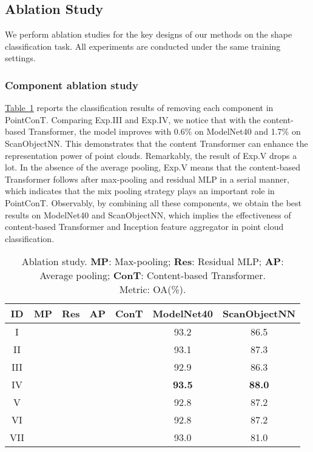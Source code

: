 \documentclass[lettersize,journal]{IEEEtran}
\begin{document}
\subsection{Ablation Study}
We perform ablation studies for the key designs of our methods on the shape classification task. 
All experiments are conducted under the same training settings.

\subsubsection*{\bf Component ablation study}
\hyperref[Table:Ablation study]{Table~\ref*{Table:Ablation study}} reports the classification results of removing each component in PointConT. 
Comparing Exp.III and Exp.IV, we notice that with the content-based Transformer, the model improves with 0.6\% on ModelNet40 and 1.7\% on ScanObjectNN. 
This demonstrates that the content Transformer can enhance the representation power of point clouds.
Remarkably, the result of Exp.V drops a lot. In the absence of the average pooling, 
Exp.V means that the content-based Transformer follows after max-pooling and residual MLP in a serial manner, 
which indicates that the mix pooling strategy plays an important role in PointConT.
Observably, by combining all these components, we obtain the best results on ModelNet40 and ScanObjectNN, 
which implies the effectiveness of content-based Transformer and Inception feature aggregator in point cloud classification.


\begin{table}[h]
  \caption{Ablation study. \textbf{MP}: Max-pooling; \textbf{Res}: Residual MLP; \textbf{AP}: Average pooling; \textbf{ConT}: Content-based Transformer. 
  \protect\\ Metric: OA(\%).}
  \label{Table:Ablation study}
  \centering
\begin{tabular}{c|cccc|cc}
    \toprule
  ID & MP     & Res      & AP      & ConT         & ModelNet40    & ScanObjectNN  \\ \midrule
  I &  &              &              &              & 93.2          & 86.5          \\
  II &  &  &              &              & 93.1          & 87.3          \\
  III &  &  &  &              & 92.9          & 86.3          \\ 
  IV &  &  &  &  & \textbf{93.5} & \textbf{88.0} \\ \midrule
  V &  &  &              &  & 92.8          & 87.2          \\
  VI &  &              &  &  & 92.8          & 87.2          \\
  VII &             &              &  &  & 93.0          & 81.0          \\
  \bottomrule
\end{tabular}\end{table}
\end{document}
